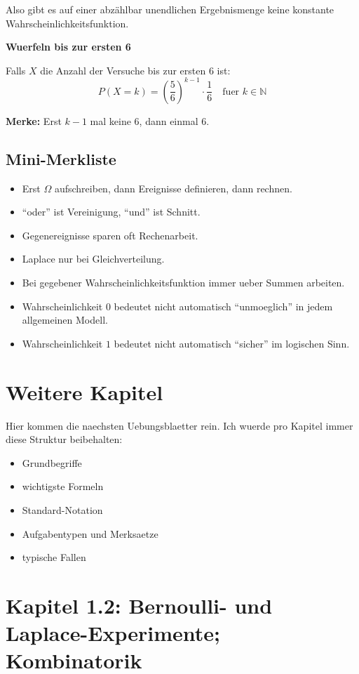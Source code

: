 \documentclass[a4paper,11pt]{article}
\begin{document}
Also gibt es auf einer abz\"ahlbar unendlichen Ergebnismenge keine konstante Wahrscheinlichkeitsfunktion.

\textbf{Wuerfeln bis zur ersten 6}

Falls $X$ die Anzahl der Versuche bis zur ersten 6 ist:
\[
P(X = k) = \left(\frac{5}{6}\right)^{k-1} \cdot \frac{1}{6}
\quad \text{fuer } k \in \mathbb{N}
\]

\textbf{Merke:}
Erst $k-1$ mal keine 6, dann einmal 6.

\subsection{Mini-Merkliste}
\begin{itemize}
  \item Erst $\Omega$ aufschreiben, dann Ereignisse definieren, dann rechnen.
  \item ``oder'' ist Vereinigung, ``und'' ist Schnitt.
  \item Gegenereignisse sparen oft Rechenarbeit.
  \item Laplace nur bei Gleichverteilung.
  \item Bei gegebener Wahrscheinlichkeitsfunktion immer ueber Summen arbeiten.
  \item Wahrscheinlichkeit $0$ bedeutet nicht automatisch ``unmoeglich'' in jedem allgemeinen Modell.
  \item Wahrscheinlichkeit $1$ bedeutet nicht automatisch ``sicher'' im logischen Sinn.
\end{itemize}

\section{Weitere Kapitel}
Hier kommen die naechsten Uebungsblaetter rein. Ich wuerde pro Kapitel immer diese Struktur beibehalten:
\begin{itemize}
  \item Grundbegriffe
  \item wichtigste Formeln
  \item Standard-Notation
  \item Aufgabentypen und Merksaetze
  \item typische Fallen
\end{itemize}

\section{Kapitel 1.2: Bernoulli- und Laplace-Experimente; Kombinatorik}
\end{document}

